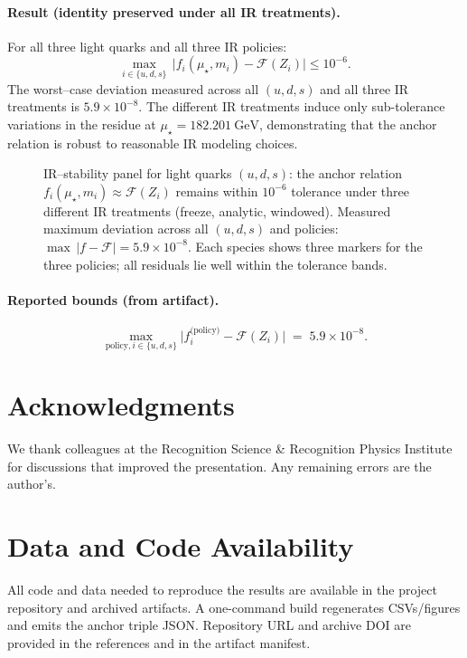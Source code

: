 \documentclass[epjc3]{svjour3}
\begin{document}
\paragraph{Result (identity preserved under all IR treatments).} For all three light quarks and all three IR policies:
\[
\max_{i\in\{u,d,s\}}\,\bigl|f_i(\mu_\star,m_i) - \mathcal F(Z_i)\bigr| \le 10^{-6}.
\]
The worst–case deviation measured across all $(u,d,s)$ and all three IR treatments is $5.9\times10^{-8}$.
The different IR treatments induce only sub-tolerance variations in the residue at $\mu_\star = 182.201~\mathrm{GeV}$, demonstrating that the anchor relation is robust to reasonable IR modeling choices.

\begin{figure}[t]
  \centering
  \caption{IR–stability panel for light quarks $(u,d,s)$: the anchor relation $f_i(\mu_\star,m_i) \approx \mathcal F(Z_i)$ remains within $10^{-6}$ tolerance under three different IR treatments (freeze, analytic, windowed). Measured maximum deviation across all $(u,d,s)$ and policies: $\max\,|f-\mathcal F| = 5.9\times10^{-8}$. Each species shows three markers for the three policies; all residuals lie well within the tolerance bands.}
  \label{fig:ir-stability}
\end{figure}

\paragraph{Reported bounds (from artifact).}
\[
\max_{\text{policy},i\in\{u,d,s\}}\bigl|f_i^{\text{(policy)}} - \mathcal F(Z_i)\bigr| \;=\; 5.9\times 10^{-8}.
\]

\section{Acknowledgments}

We thank colleagues at the Recognition Science \& Recognition Physics Institute for discussions that improved the presentation. Any remaining errors are the author's.

\section{Data and Code Availability}

All code and data needed to reproduce the results are available in the project repository and archived artifacts. A one-command build regenerates CSVs/figures and emits the anchor triple JSON. Repository URL and archive DOI are provided in the references and in the artifact manifest.
\end{document}
